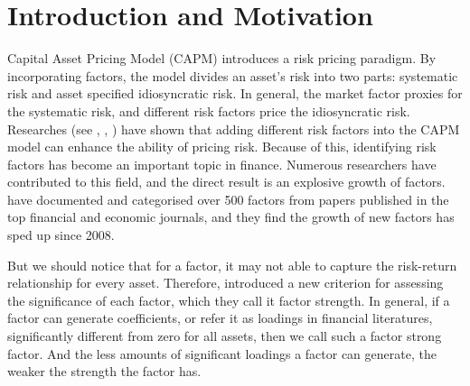 


\section{Introduction and Motivation}
Capital Asset Pricing Model (CAPM) \cite{Sharpe1964, Lintner1965, Black1972} introduces a risk pricing paradigm.
By incorporating factors, the model divides an asset's risk into two parts: systematic risk and asset specified idiosyncratic risk.
In general, the market factor proxies for the systematic risk, and different risk factors price the idiosyncratic risk.
Researches (see , , ) have shown that adding different risk factors into the CAPM model can enhance the ability of pricing risk.
Because of this, identifying risk factors has become an important topic in finance.
Numerous researchers have contributed to this field, and the direct result is an explosive growth of factors.
  have documented and categorised over 500 factors from papers published in the top financial and economic journals, and they find the growth of new factors has sped up since 2008. 

But we should notice that for a factor, it may not able to capture the risk-return relationship for every asset.
Therefore,  introduced a new criterion for assessing the significance of each factor, which they call it factor strength.
In general, if a factor can generate coefficients, or refer it as loadings in financial literatures, significantly different from zero for all assets, then we call such a factor strong factor.
And the less amounts of significant loadings a factor can generate, the weaker the strength the factor has.

